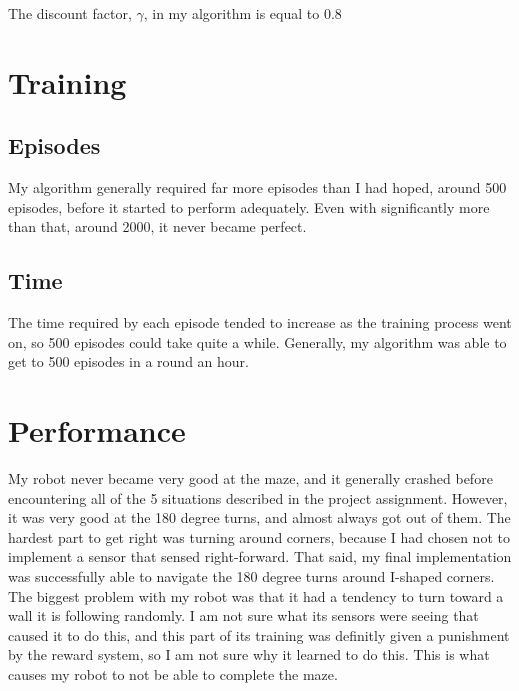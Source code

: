 \documentclass[letterpaper, 10 pt, conference]{ieeeconf}  %
\begin{document}
The discount factor, $\gamma$, in my algorithm is equal to 0.8

\section{Training}

\subsection{Episodes}

My algorithm generally required far more episodes than I had hoped, around 500 episodes, before it started to perform adequately. Even with significantly more than that, around 2000, it never became perfect.

\subsection{Time}

The time required by each episode tended to increase as the training process went on, so 500 episodes could take quite a while. Generally, my algorithm was able to get to 500 episodes in a round an hour.

\section{Performance}

My robot never became very good at the maze, and it generally crashed before encountering all of the 5 situations described in the project assignment. However, it was very good at the 180 degree turns, and almost always got out of them. The hardest part to get right was turning around corners, because I had chosen not to implement a sensor that sensed right-forward. That said, my final implementation was successfully able to navigate the 180 degree turns around I-shaped corners. The biggest problem with my robot was that it had a tendency to turn toward a wall it is following randomly. I am not sure what its sensors were seeing that caused it to do this, and this part of its training was definitly given a punishment by the reward system, so I am not sure why it learned to do this. This is what causes my robot to not be able to complete the maze.
\end{document}
